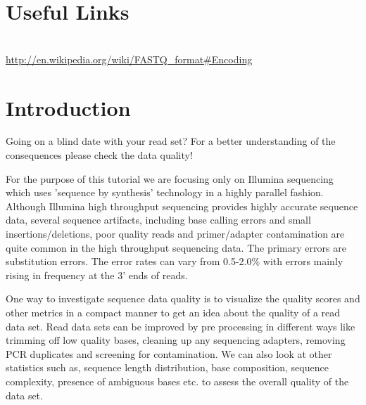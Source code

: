 \section{Useful Links}
 
\begin{description}[style=multiline,labelindent=0cm,align=left,leftmargin=0.5cm]
  \item[FASTQ Encoding]\hfill\\
    \url{http://en.wikipedia.org/wiki/FASTQ_format#Encoding}
\end{description}


\newpage

\section{Introduction}

\begin{note}
Going on a blind date with your read set? For a better understanding of the
consequences please check the data quality!
\end{note}

For the purpose of this tutorial we are focusing only on Illumina sequencing
which uses 'sequence by synthesis' technology in a highly parallel fashion.
Although Illumina high throughput  sequencing provides highly accurate sequence
data, several sequence artifacts, including base calling errors and small
insertions/deletions, poor quality reads and primer/adapter contamination are
quite common in the high throughput sequencing data. The primary errors are
substitution errors. The error rates can vary from 0.5-2.0\% with errors mainly
rising in frequency at the 3' ends of reads.

One way to investigate sequence data quality is to visualize the quality scores
and other metrics in a compact manner to get an idea about the quality of a read
data set. Read data sets can be improved by pre processing in different ways
like trimming off low quality bases, cleaning up any sequencing adapters,
removing PCR duplicates and screening for contamination. We can also look at other statistics such
as, sequence length distribution, base composition, sequence complexity,
presence of ambiguous bases etc. to assess the overall quality of the data set.

